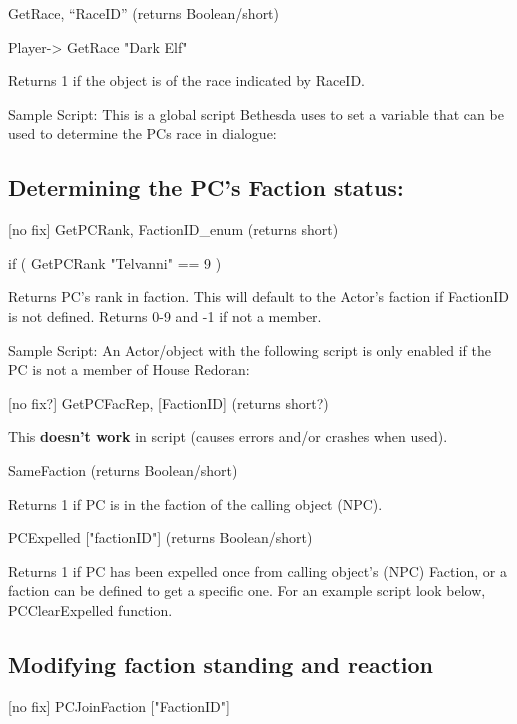 GetRace, ``RaceID'' (returns Boolean/short)

Player-> GetRace "Dark Elf"

Returns 1 if the object is of the race indicated by RaceID.

Sample Script: This is a global script Bethesda uses to set a variable
that can be used to determine the PCs race in dialogue:



\hypertarget{determining-the-pcs-faction-status}{%
\subsection{Determining the PC's Faction
status:}\label{determining-the-pcs-faction-status}}

{[}no fix{]} GetPCRank, FactionID\_enum (returns short)

if ( GetPCRank "Telvanni" == 9 )

Returns PC's rank in faction. This will default to the Actor's faction
if FactionID is not defined. Returns 0-9 and -1 if not a member.

Sample Script: An Actor/object with the following script is only enabled
if the PC is not a member of House Redoran:



{[}no fix?{]} GetPCFacRep, {[}FactionID{]} (returns short?)

This \textbf{doesn't work} in script (causes errors and/or crashes when
used).

SameFaction (returns Boolean/short)

Returns 1 if PC is in the faction of the calling object (NPC).

PCExpelled {[}"factionID"{]} (returns Boolean/short)

Returns 1 if PC has been expelled once from calling object's (NPC)
Faction, or a faction can be defined to get a specific one. For an
example script look below, PCClearExpelled function.

\hypertarget{modifying-faction-standing-and-reaction}{%
\subsection{Modifying faction standing and
reaction}\label{modifying-faction-standing-and-reaction}}

{[}no fix{]} PCJoinFaction {[}"FactionID"{]}

